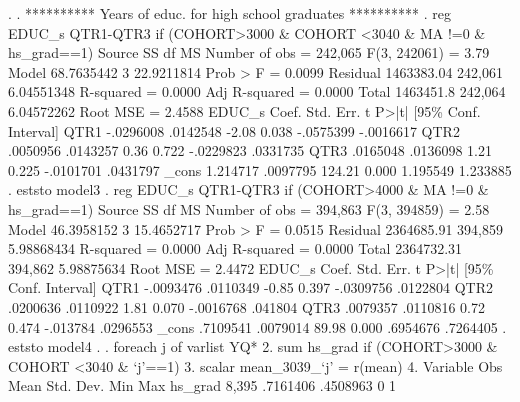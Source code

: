 {\smallskip}
. 
. **********  Years of educ. for high school graduates **********
. reg EDUC_s QTR1-QTR3  if (COHORT>3000 \& COHORT <3040 \& MA !=0 \& hs_grad==1)
{\smallskip}
      Source {\VBAR}       SS           df       MS      Number of obs   =   242,065
   F(3, 242061)    =      3.79
       Model {\VBAR}  68.7635442         3  22.9211814   Prob > F        =    0.0099
    Residual {\VBAR}  1463383.04   242,061  6.04551348   R-squared       =    0.0000
   Adj R-squared   =    0.0000
       Total {\VBAR}   1463451.8   242,064  6.04572262   Root MSE        =    2.4588
{\smallskip}
      EDUC_s {\VBAR}      Coef.   Std. Err.      t    P>|t|     [95\% Conf. Interval]
        QTR1 {\VBAR}  -.0296008   .0142548    -2.08   0.038    -.0575399   -.0016617
        QTR2 {\VBAR}   .0050956   .0143257     0.36   0.722    -.0229823    .0331735
        QTR3 {\VBAR}   .0165048   .0136098     1.21   0.225    -.0101701    .0431797
       _cons {\VBAR}   1.214717   .0097795   124.21   0.000     1.195549    1.233885
{\smallskip}
. eststo model3
{\smallskip}
. reg EDUC_s QTR1-QTR3  if (COHORT>4000 \& MA !=0 \& hs_grad==1)
{\smallskip}
      Source {\VBAR}       SS           df       MS      Number of obs   =   394,863
   F(3, 394859)    =      2.58
       Model {\VBAR}  46.3958152         3  15.4652717   Prob > F        =    0.0515
    Residual {\VBAR}  2364685.91   394,859  5.98868434   R-squared       =    0.0000
   Adj R-squared   =    0.0000
       Total {\VBAR}  2364732.31   394,862  5.98875634   Root MSE        =    2.4472
{\smallskip}
      EDUC_s {\VBAR}      Coef.   Std. Err.      t    P>|t|     [95\% Conf. Interval]
        QTR1 {\VBAR}  -.0093476   .0110349    -0.85   0.397    -.0309756    .0122804
        QTR2 {\VBAR}   .0200636   .0110922     1.81   0.070    -.0016768     .041804
        QTR3 {\VBAR}   .0079357   .0110816     0.72   0.474     -.013784    .0296553
       _cons {\VBAR}   .7109541   .0079014    89.98   0.000     .6954676    .7264405
{\smallskip}
. eststo model4
{\smallskip}
. 
. foreach j of varlist YQ* {\lbr}
  2.                 sum hs_grad if (COHORT>3000 \& COHORT <3040 \& `j'==1)
  3.                 scalar mean_3039_`j' = r(mean)
  4. {\rbr}       
{\smallskip}
    Variable {\VBAR}        Obs        Mean    Std. Dev.       Min        Max
     hs_grad {\VBAR}      8,395    .7161406    .4508963          0          1
